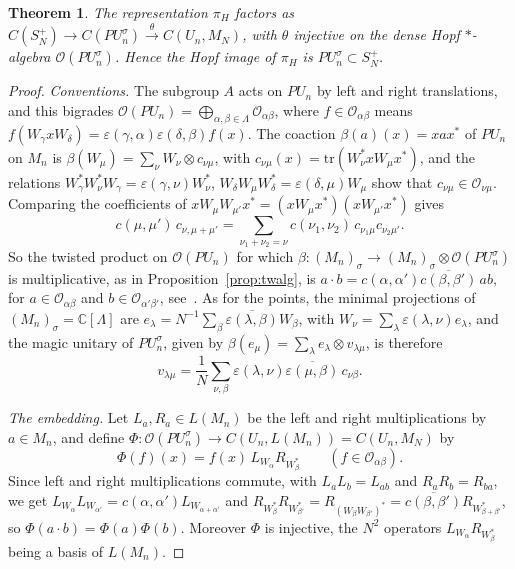 \documentclass[11pt]{amsart}
\newtheorem{theorem}{Theorem}[section]
\theoremstyle{definition}
\theoremstyle{remark}
\theoremstyle{plain}
\numberwithin{equation}{section}
\numberwithin{table}{section}
\newcommand{\C}{\mathbb C}
\begin{document}
\begin{theorem}\label{thm:bn}
The representation $\pi_H$ factors as $C(S_N^+)\to C(PU_n^\sigma)\xrightarrow{\theta}C(U_n,M_N)$, with $\theta$ injective on the dense Hopf $*$-algebra $\mathcal O(PU_n^\sigma)$. Hence the Hopf image of $\pi_H$ is $PU_n^\sigma\subset S_N^+$.
\end{theorem}

\begin{proof}
\emph{Conventions.} The subgroup $A$ acts on $PU_n$ by left and right translations, and this bigrades $\mathcal O(PU_n)=\bigoplus_{\alpha,\beta\in\Lambda}\mathcal O_{\alpha\beta}$, where $f\in\mathcal O_{\alpha\beta}$ means $f(W_\gamma xW_\delta)=\varepsilon(\gamma,\alpha)\varepsilon(\delta,\beta)f(x)$. The coaction $\beta(a)(x)=xax^*$ of $PU_n$ on $M_n$ is $\beta(W_\mu)=\sum_\nu W_\nu\otimes c_{\nu\mu}$, with $c_{\nu\mu}(x)=\mathrm{tr}(W_\nu^*xW_\mu x^*)$, and the relations $W_\gamma^*W_\nu^*W_\gamma=\varepsilon(\gamma,\nu)W_\nu^*$, $W_\delta W_\mu W_\delta^*=\varepsilon(\delta,\mu)W_\mu$ show that $c_{\nu\mu}\in\mathcal O_{\nu\mu}$. Comparing the coefficients of $xW_\mu W_{\mu'}x^*=(xW_\mu x^*)(xW_{\mu'}x^*)$ gives
\[
c(\mu,\mu')\,c_{\nu,\mu+\mu'}=\sum_{\nu_1+\nu_2=\nu}c(\nu_1,\nu_2)\,c_{\nu_1\mu}c_{\nu_2\mu'} .
\]
So the twisted product on $\mathcal O(PU_n)$ for which $\beta:(M_n)_\sigma\to(M_n)_\sigma\otimes\mathcal O(PU_n^\sigma)$ is multiplicative, as in Proposition~\ref{prop:twalg}, is $a\cdot b=c(\alpha,\alpha')\overline{c(\beta,\beta')}\,ab$, for $a\in\mathcal O_{\alpha\beta}$ and $b\in\mathcal O_{\alpha'\beta'}$, see~\cite{doi,ev}. As for the points, the minimal projections of $(M_n)_\sigma=\C[\Lambda]$ are $e_\lambda=N^{-1}\sum_\beta\overline{\varepsilon(\lambda,\beta)}W_\beta$, with $W_\nu=\sum_\lambda\varepsilon(\lambda,\nu)e_\lambda$, and the magic unitary of $PU_n^\sigma$, given by $\beta(e_\mu)=\sum_\lambda e_\lambda\otimes v_{\lambda\mu}$, is therefore
\[
v_{\lambda\mu}=\frac1N\sum_{\nu,\beta}\varepsilon(\lambda,\nu)\overline{\varepsilon(\mu,\beta)}\,c_{\nu\beta} .
\]

\emph{The embedding.} Let $L_a,R_a\in L(M_n)$ be the left and right multiplications by $a\in M_n$, and define $\Phi:\mathcal O(PU_n^\sigma)\to C(U_n,L(M_n))=C(U_n,M_N)$ by
\[
\Phi(f)(x)=f(x)\,L_{W_\alpha}R_{W_\beta^*}\qquad(f\in\mathcal O_{\alpha\beta}).
\]
Since left and right multiplications commute, with $L_aL_b=L_{ab}$ and $R_aR_b=R_{ba}$, we get $L_{W_\alpha}L_{W_{\alpha'}}=c(\alpha,\alpha')L_{W_{\alpha+\alpha'}}$ and $R_{W_\beta^*}R_{W_{\beta'}^*}=R_{(W_\beta W_{\beta'})^*}=\overline{c(\beta,\beta')}R_{W_{\beta+\beta'}^*}$, so $\Phi(a\cdot b)=\Phi(a)\Phi(b)$. Moreover $\Phi$ is injective, the $N^2$ operators $L_{W_\alpha}R_{W_\beta^*}$ being a basis of $L(M_n)$.


\end{proof}
\end{document}
